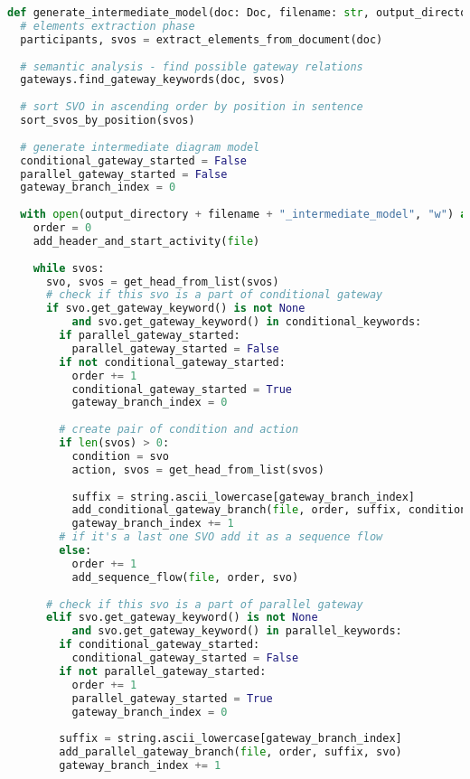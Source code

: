 \begin{lstlisting}[language=Python, caption={Intermediate process model generation function listing}, label={lst:intermediate_model_generation}]
def generate_intermediate_model(doc: Doc, filename: str, output_directory: str):
  # elements extraction phase
  participants, svos = extract_elements_from_document(doc)
  
  # semantic analysis - find possible gateway relations
  gateways.find_gateway_keywords(doc, svos)
  
  # sort SVO in ascending order by position in sentence
  sort_svos_by_position(svos)
  
  # generate intermediate diagram model
  conditional_gateway_started = False
  parallel_gateway_started = False
  gateway_branch_index = 0
  
  with open(output_directory + filename + "_intermediate_model", "w") as file:
    order = 0
    add_header_and_start_activity(file)
    
    while svos:
      svo, svos = get_head_from_list(svos)
      # check if this svo is a part of conditional gateway
      if svo.get_gateway_keyword() is not None
          and svo.get_gateway_keyword() in conditional_keywords:
        if parallel_gateway_started:
          parallel_gateway_started = False
        if not conditional_gateway_started:
          order += 1
          conditional_gateway_started = True
          gateway_branch_index = 0
        
        # create pair of condition and action
        if len(svos) > 0:
          condition = svo
          action, svos = get_head_from_list(svos)
          
          suffix = string.ascii_lowercase[gateway_branch_index]
          add_conditional_gateway_branch(file, order, suffix, condition, action)
          gateway_branch_index += 1
        # if it's a last one SVO add it as a sequence flow
        else:
          order += 1
          add_sequence_flow(file, order, svo)
      
      # check if this svo is a part of parallel gateway
      elif svo.get_gateway_keyword() is not None
          and svo.get_gateway_keyword() in parallel_keywords:
        if conditional_gateway_started:
          conditional_gateway_started = False
        if not parallel_gateway_started:
          order += 1
          parallel_gateway_started = True
          gateway_branch_index = 0
      
        suffix = string.ascii_lowercase[gateway_branch_index]
        add_parallel_gateway_branch(file, order, suffix, svo)
        gateway_branch_index += 1
      

\end{lstlisting}
